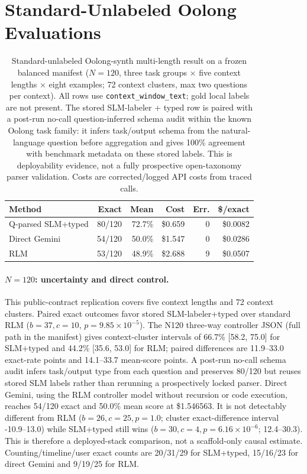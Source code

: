 \FloatBarrier
\section{Standard-Unlabeled Oolong Evaluations}


\begin{table}[t]
\centering
\small
\setlength{\tabcolsep}{4pt}
\begin{tabular}{@{}lrrrrr@{}}
\toprule
\textbf{Method} & \textbf{Exact} & \textbf{Mean} & \textbf{Cost} & \textbf{Err.} & \textbf{\$/exact} \\
\midrule
Q-parsed SLM+typed & 80/120 & 72.7\% & \$0.659 & 0 & \$0.0082 \\
Direct Gemini & 54/120 & 50.0\% & \$1.547 & 0 & \$0.0286 \\
RLM & 53/120 & 48.9\% & \$2.688 & 9 & \$0.0507 \\
\bottomrule
\end{tabular}
\caption{Standard-unlabeled Oolong-synth multi-length result on a frozen balanced manifest ($N=120$, three task groups $\times$ five context lengths $\times$ eight examples; 72 context clusters, max two questions per context). All rows use \texttt{context\_window\_text}; gold local labels are not present. The stored SLM-labeler + typed row is paired with a post-run no-call question-inferred schema audit within the known Oolong task family: it infers task/output schema from the natural-language question before aggregation and gives 100\% agreement with benchmark metadata on these stored labels. This is deployability evidence, not a fully prospective open-taxonomy parser validation. Costs are corrected/logged API costs from traced calls.}
\label{tab:supp-oolong-standard-n120}
\end{table}

\paragraph{$N=120$: uncertainty and direct control.}
This public-contract replication covers five context lengths and 72 context clusters. Paired exact outcomes favor stored SLM-labeler+typed over standard RLM ($b=37,c=10$, $p=9.85\times10^{-5}$). The N120 three-way controller JSON (full path in the manifest) gives context-cluster intervals of 66.7\% [58.2, 75.0] for SLM+typed and 44.2\% [35.6, 53.0] for RLM; paired differences are 11.9--33.0 exact-rate points and 14.1--33.7 mean-score points. A post-run no-call schema audit infers task/output type from each question and preserves 80/120 but reuses stored SLM labels rather than rerunning a prospectively locked parser. Direct Gemini, using the RLM controller model without recursion or code execution, reaches 54/120 exact and 50.0\% mean score at \$1.546563. It is not detectably different from RLM ($b=26,c=25,p=1.0$; cluster exact-difference interval -10.9--13.0) while SLM+typed still wins ($b=30,c=4,p=6.16\times10^{-6}$; 12.4--30.3). This is therefore a deployed-stack comparison, not a scaffold-only causal estimate. Counting/timeline/user exact counts are 20/31/29 for SLM+typed, 15/16/23 for direct Gemini and 9/19/25 for RLM.


